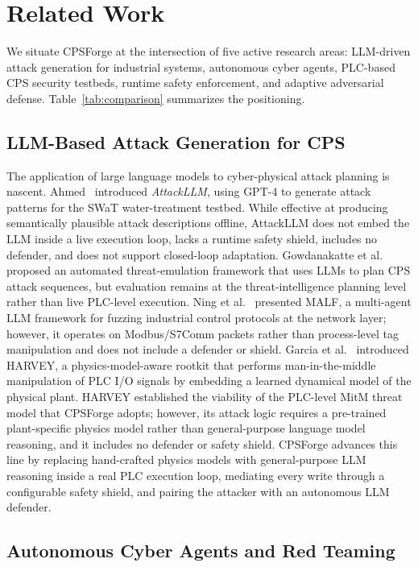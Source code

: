 \section{Related Work}
\label{sec:related}

We situate CPSForge at the intersection of five active research areas: LLM-driven attack generation for industrial systems, autonomous cyber agents, PLC-based CPS security testbeds, runtime safety enforcement, and adaptive adversarial defense. Table~\ref{tab:comparison} summarizes the positioning.

\subsection{LLM-Based Attack Generation for CPS}

The application of large language models to cyber-physical attack planning is nascent. Ahmed~\cite{ahmed2025attackllm} introduced \emph{AttackLLM}, using GPT-4 to generate attack patterns for the SWaT water-treatment testbed. While effective at producing semantically plausible attack descriptions offline, AttackLLM does not embed the LLM inside a live execution loop, lacks a runtime safety shield, includes no defender, and does not support closed-loop adaptation. Gowdanakatte et al.~\cite{gowdanakatte2025threat} proposed an automated threat-emulation framework that uses LLMs to plan CPS attack sequences, but evaluation remains at the threat-intelligence planning level rather than live PLC-level execution. Ning et al.~\cite{ning2025malf} presented MALF, a multi-agent LLM framework for fuzzing industrial control protocols at the network layer; however, it operates on Modbus/S7Comm packets rather than process-level tag manipulation and does not include a defender or shield. Garcia et al.~\cite{garcia2017harvey} introduced HARVEY, a physics-model-aware rootkit that performs man-in-the-middle manipulation of PLC I/O signals by embedding a learned dynamical model of the physical plant. HARVEY established the viability of the PLC-level MitM threat model that CPSForge adopts; however, its attack logic requires a pre-trained plant-specific physics model rather than general-purpose language model reasoning, and it includes no defender or safety shield. CPSForge advances this line by replacing hand-crafted physics models with general-purpose LLM reasoning inside a real PLC execution loop, mediating every write through a configurable safety shield, and pairing the attacker with an autonomous LLM defender.

\subsection{Autonomous Cyber Agents and Red Teaming}

